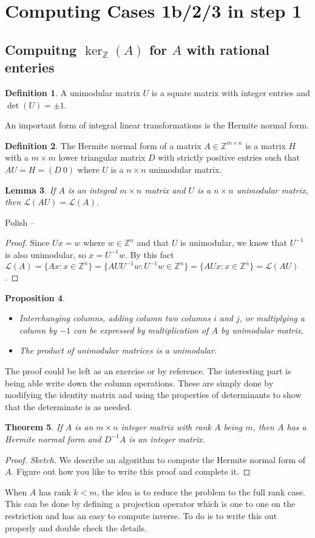 \documentclass{article}
\newcommand{\Z}[0]{\mathbb{Z}}		%
\newcommand{\La}[0]{\mathcal L}
\newtheorem{thm}{Theorem}[section]
\newtheorem{lem}[thm]{Lemma}
\newtheorem{prop}[thm]{Proposition}
\theoremstyle{definition}
\newtheorem{defn}[thm]{Definition}
\theoremstyle{remark}
\begin{document}
\section{Computing Cases 1b/2/3 in step 1}
\subsection{Compuitng $\ker_\Z(A)$ for $A$ with rational enteries}
\begin{defn}
A unimodular matrix $U$ is a square matrix with integer entries and $\det(U)=\pm 1$. %
\end{defn}
An important form of integral linear transformations is the Hermite normal form. 
\begin{defn}
The Hermite normal form of a matrix $A\in\Z^{m\times n}$ is a matrix $H$ with a $m\times m$ lower triangular matrix $D$ with strictly positive entries such that $AU = H = (D~0)$ where $U$ is a $n\times n$ unimodular matrix.
\end{defn}
\begin{lem}
If $A$ is an integral $m\times n$ matrix and $U$ is a $n\times n$ unimodular matrix, then $\La(AU) = \La(A)$. 
\end{lem}
{\color{blue}Polish --  
\begin{proof}
 Since $Ux = w$ where $w\in \Z^n$ and that $U$ is unimodular, we know that $U^{-1}$ is also unimodular, so $x = U^{-1}w$. By this fact $\La(A) = \{Ax :x\in \Z^n\} = \{AU U^{-1}w : U^{-1}w\in \Z^n \} =\{AU x : x\in \Z^n \} =\La(AU)$. 
 \end{proof}}
\begin{prop}
\begin{itemize}
    \item Interchanging columns, adding column two columns $i$ and $j$, or multiplying a column by $-1$ can be expressed by multiplication of $A$ by unimodular matrix. 
    \item The product of unimodular matrices is a unimodular. 
\end{itemize}
\end{prop}
The proof could be left as an exercise or by reference. The interesting part is being able write down the column operations. These are simply done by modifying the identity matrix and using the properties of determinants to show that the determinate is as needed. 
\begin{thm}\label{HNF}
If $A$ is an $m\times n$ integer matrix with rank $A$ being $m$, then $A$ has a Hermite normal form and $D^{-1}A$ is an integer matrix. 
\end{thm}
\begin{proof}
\textit{Sketch.}
We describe an algorithm to compute the Hermite normal form of $A$. {\color{blue} Figure out how you like to write this proof and complete it.} 
\end{proof}
{\color{red} When $A$ has rank $k<m$, the idea is to reduce the problem to the full rank case. This can be done by defining a projection operator which is one to one on the restriction and has an easy to compute inverse. To do is to write this out properly and double check the details. }
\end{document}

